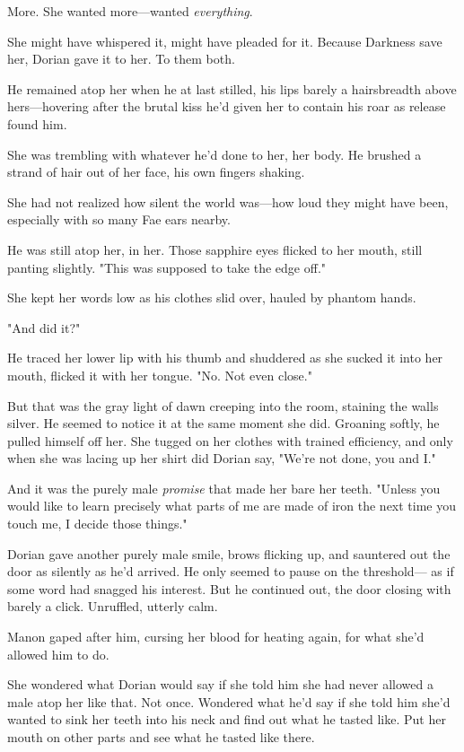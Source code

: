More. She wanted more---wanted \emph{everything}.

She might have whispered it, might have pleaded for it. Because Darkness save her, Dorian gave it to her. To them both.

He remained atop her when he at last stilled, his lips barely a hairsbreadth above hers---hovering after the brutal kiss he'd given her to contain his roar as release found him.

She was trembling with  whatever he'd done to her, her body. He brushed a strand of hair out of her face, his own fingers shaking.

She had not realized how silent the world was---how loud they might have been, especially with so many Fae ears nearby.

He was still atop her, in her. Those sapphire eyes flicked to her mouth, still panting slightly. "This was supposed to take the edge off."

She kept her words low as his clothes slid over, hauled by phantom hands.

"And did it?"

He traced her lower lip with his thumb and shuddered as she sucked it into her mouth, flicked it with her tongue. "No. Not even close."

But that was the gray light of dawn creeping into the room, staining the walls silver. He seemed to notice it at the same moment she did. Groaning softly, he pulled himself off her. She tugged on her clothes with trained efficiency, and only when she was lacing up her shirt did Dorian say, "We're not done, you and I."

And it was the purely male \emph{promise} that made her bare her teeth. "Unless you would like to learn precisely what parts of me are made of iron the next time you touch me, I decide those things."

Dorian gave another purely male smile, brows flicking up, and sauntered out the door as silently as he'd arrived. He only seemed to pause on the threshold--- as if some word had snagged his interest. But he continued out, the door closing with barely a click. Unruffled, utterly calm.

Manon gaped after him, cursing her blood for heating again, for 
what she'd allowed him to do.

She wondered what Dorian would say if she told him she had never allowed a male atop her like that. Not once. Wondered what he'd say if she told him she'd wanted to sink her teeth into his neck and find out what he tasted like. Put her mouth on other parts and see what he tasted like there.

